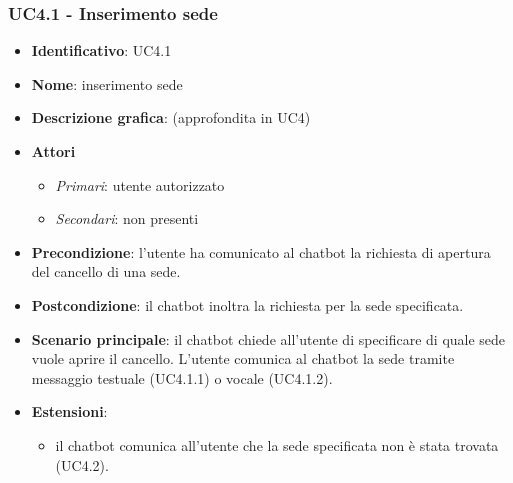 \subsubsection{UC4.1 - Inserimento sede}
\begin{itemize}
    \item \textbf{Identificativo}: UC4.1
    \item \textbf{Nome}: inserimento sede
    \item \textbf{Descrizione grafica}: (approfondita in UC4)
    \item \textbf{Attori}
 \begin{itemize} 
    \item \textit{Primari}: utente autorizzato 
    \item \textit{Secondari}: non presenti
 \end{itemize}
 \item \textbf{Precondizione}: l'utente ha comunicato al chatbot la richiesta di apertura del cancello di una sede.
 \item \textbf{Postcondizione}: il chatbot inoltra la richiesta per la sede specificata.
 \item \textbf{Scenario principale}: il chatbot chiede all'utente di specificare di quale sede vuole aprire il cancello. L'utente comunica al chatbot la sede tramite messaggio testuale (UC4.1.1) o vocale (UC4.1.2).
\item \textbf{Estensioni}: 
 \begin{itemize} 
    \item il chatbot comunica all'utente che la sede specificata non è stata trovata (UC4.2).
 \end{itemize}
\end{itemize}

